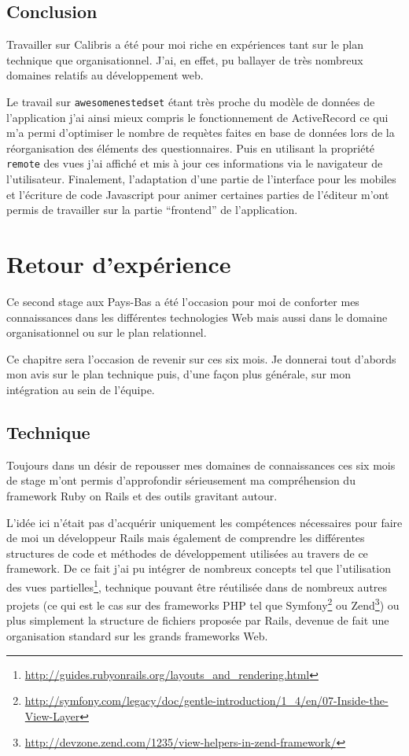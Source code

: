 \documentclass[12pt,a4paper]{book}
\begin{document}
\section*{Conclusion}

Travailler sur Calibris a été pour moi riche en expériences tant sur le plan technique que organisationnel. J'ai, en effet, pu ballayer de très nombreux domaines relatifs au développement web. 

Le travail sur \texttt{awesomenestedset} étant très proche du modèle de données de l'application j'ai ainsi mieux compris le fonctionnement de ActiveRecord ce qui m'a permi d'optimiser le nombre de requètes faites en base de données lors de la réorganisation des éléments des questionnaires.
Puis en utilisant la propriété \texttt{remote} des vues j'ai affiché et mis à jour ces informations via le navigateur de l'utilisateur.
Finalement, l'adaptation d'une partie de l'interface pour les mobiles et l'écriture de code Javascript pour animer certaines parties de l'éditeur m'ont permis de travailler sur la partie ``frontend'' de l'application.

\chapter{Retour d'expérience}

Ce second stage aux Pays-Bas a été l'occasion pour moi de conforter mes connaissances dans les différentes technologies Web mais aussi dans le domaine organisationnel ou sur le plan relationnel.

Ce chapitre sera l'occasion de revenir sur ces six mois. Je donnerai tout d'abords mon avis sur le plan technique puis, d'une façon plus générale, sur mon intégration au sein de l'équipe.

\section{Technique}

Toujours dans un désir de repousser mes domaines de connaissances ces six mois de stage m'ont permis d'approfondir sérieusement ma compréhension du framework Ruby on Rails et des outils gravitant autour.

L'idée ici n'était pas d'acquérir uniquement les compétences nécessaires pour faire de moi un développeur Rails mais également de comprendre les différentes structures de code et méthodes de développement utilisées au travers de ce framework. De ce fait j'ai pu intégrer de nombreux concepts tel que l'utilisation des vues partielles\footnote{\url{http://guides.rubyonrails.org/layouts_and_rendering.html}}, technique pouvant être réutilisée dans de nombreux autres projets (ce qui est le cas sur des frameworks PHP tel que Symfony\footnote{\url{http://symfony.com/legacy/doc/gentle-introduction/1_4/en/07-Inside-the-View-Layer}} ou Zend\footnote{\url{http://devzone.zend.com/1235/view-helpers-in-zend-framework/}}) ou plus simplement la structure de fichiers proposée par Rails, devenue de fait une organisation standard sur les grands frameworks Web.
\end{document}
